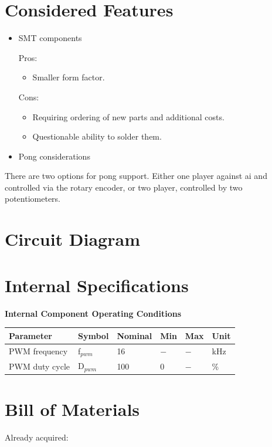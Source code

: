 \documentclass{article}
\begin{document}
\section{Considered Features}

\begin{itemize}
	\item SMT components

	Pros:
	\begin{itemize}
		\item Smaller form factor.
	\end{itemize}
	Cons:
	\begin{itemize}
		\item Requiring ordering of new parts and additional costs.
		\item Questionable ability to solder them.
	\end{itemize}

	\item Pong considerations
\end{itemize}
There are two options for pong support. Either one player against ai and controlled via
the rotary encoder, or two player, controlled by two potentiometers.


\section{Circuit Diagram}

\section{Internal Specifications}
\begin{center}
	\textbf{Internal Component Operating Conditions}\\
	\begin{tabular}{ |p{5cm}||p{1.5cm}|p{1.5cm}|p{1cm}|p{1cm}|p{4cm}|}
		\hline
		\textbf{Parameter}&\textbf{Symbol}&\textbf{Nominal}&\textbf{Min}&\textbf{Max}&\textbf{Unit}\\
		\hline\hline
		PWM frequency		& f$_{pwm}$	&	16	&	$-$	&	$-$	&	kHz	\\
		PWM duty cycle		& D$_{pwm}$	&	100	&	0	&	$-$	&	\%	\\
		\hline
	\end{tabular}
\end{center}



\section{Bill of Materials}
Already acquired:
\end{document}
